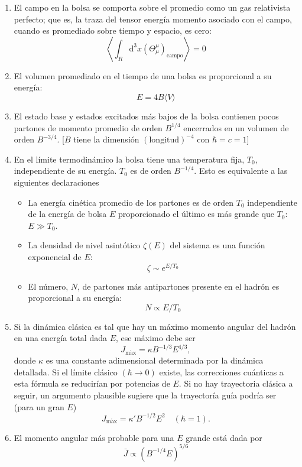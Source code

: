 \begin{enumerate}

\item El campo en la bolsa se comporta sobre el promedio como un gas relativista perfecto; que es, la traza del tensor energía momento asociado con el campo, cuando es promediado sobre tiempo y espacio, es cero:
\begin{equation}
\left\langle \int_{R} {\mathrm{d}}^{3} x ({\Theta}_{\mu}^{\mu})_{\mathrm{campo}} \right\rangle = 0
\end{equation}
\item El volumen promediado en el tiempo de una bolsa es proporcional a su energía:
\begin{equation}
E = 4B \langle V \rangle
\end{equation}
\item El estado base y estados excitados más bajos de la bolsa contienen pocos partones de momento promedio de orden ${B}^{1/4}$ encerrados en un volumen de orden ${B}^{-3/4}$. [$B$ tiene la dimensión $(\mathrm{longitud})^{-4}$ con $\hbar=c=1$]
\item En el límite termodinámico la bolsa tiene una temperatura fija, ${T}_{0}$, independiente de su energía. ${T}_{0}$ es de orden ${B}^{-1/4}$. Esto es equivalente a las siguientes declaraciones
\begin{itemize}
\item La energía cinética promedio de los partones es de orden ${T}_{0}$ independiente de la energía de bolsa $E$ proporcionado el último es más grande que ${T}_{0}$: ${E} \gg {T}_{0}$.
\item La densidad de nivel asintótico ${\zeta(E)}$ del sistema es una función exponencial de $E$:
\[
\zeta \sim {e}^{E/{T}_{0}}
\]
\item El número, $N$, de partones más antipartones presente en el hadrón es proporcional a su energía:
\[
N \propto E/{T}_{0}
\]
\end{itemize}
\item Si la dinámica clásica es tal que hay un máximo momento angular del hadrón en una energía total dada $E$, ese máximo debe ser 
\[
{J}_{\mathrm{m\acute{a}x}} = \kappa {B}^{-1/3} {E}^{4 / 3},
\]
donde ${\kappa}$ es una constante adimensional determinada por la dinámica detallada. Si el límite clásico $({\hbar} \rightarrow 0)$ existe, las correcciones cuánticas a esta fórmula se reducirían por potencias de $E$. Si no hay trayectoria clásica a seguir, un argumento plausible sugiere que la trayectoría guía podría ser (para un gran $E$)
\[
{J}_{\mathrm{m\acute{a}x}} = {\kappa}' {B}^{-1/2} {E}^{2} \quad ({\hbar = 1}).
\]
\item El momento angular más probable para una $E$ grande está dada por 
\[
\bar{J} \propto ({B}^{-1/4} E)^{5/6}
\]
\end{enumerate}





































